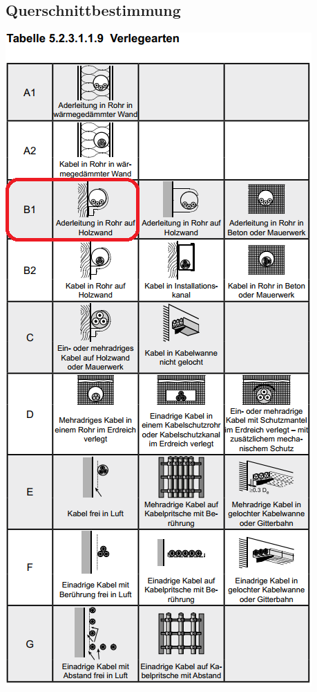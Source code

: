 \begin{landscape}
\chapter{Querschnittbestimmung}\label{app:nin}
\begin{minipage}{0.35\textwidth}
		\includegraphics[height=.80\textheight]{images/NIN_Art.png}

\end{minipage}
\end{landscape}
